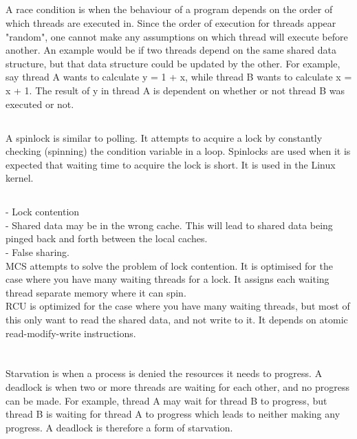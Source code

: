 \documentclass{article}
\begin{document}
\subsection{}
A race condition is when the behaviour of a program depends on the order of which threads are executed in. Since the order of execution for threads appear "random", one cannot make any assumptions on which thread will execute before another. An example would be if two threads depend on the same shared data structure, but that data structure could be updated by the other. For example, say thread A wants to calculate y = 1 + x, while thread B wants to calculate x = x + 1. The result of y in thread A is dependent on whether or not thread B was executed or not.

\subsection{}
A spinlock is similar to polling. It attempts to acquire a lock by constantly checking (spinning) the condition variable in a loop. Spinlocks are used when it is expected that waiting time to acquire the lock is short. It is used in the Linux kernel.

\subsection{}
- Lock contention\\
- Shared data may be in the wrong cache. This will lead to shared data being pinged back and forth between the local caches.\\
- False sharing.\\

MCS attempts to solve the problem of lock contention. It is optimised for the case where you have many waiting threads for a lock. It assigns each waiting thread separate memory where it can spin.\\

RCU is optimized for the case where you have many waiting threads, but most of this only want to read the shared data, and not write to it. It depends on atomic read-modify-write instructions.


\section{}
\subsection{}
Starvation is when a process is denied the resources it needs to progress. A deadlock is when two or more threads are waiting for each other, and no progress can be made. For example, thread A may wait for thread B to progress, but thread B is waiting for thread A to progress which leads to neither making any progress. A deadlock is therefore a form of starvation.
\end{document}
